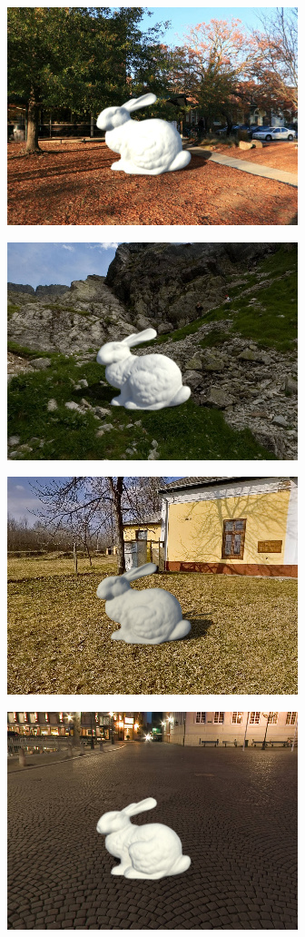 \begin{multicols}{3}

\includegraphics[width=\mywidth]{pano_amclvftibwceyr.jpg}

\includegraphics[width=\mywidth]{pano_aoexvqbqucbcuw.jpg}

\includegraphics[width=\mywidth]{pano_apkqohzzaljfyl.jpg}

\includegraphics[width=\mywidth]{pano_aqamdutlzvraki.jpg}


\end{multicols}
